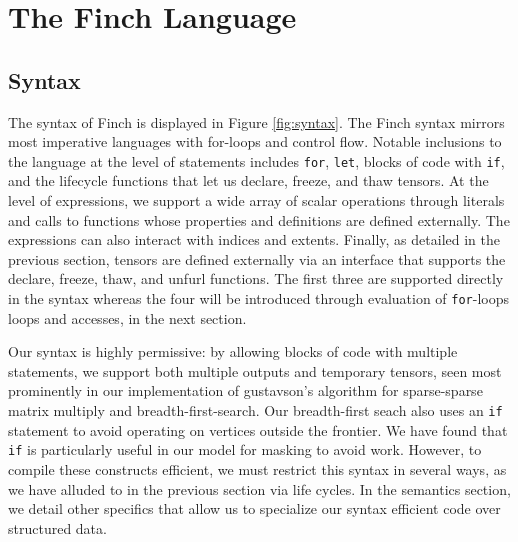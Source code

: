 
\section{The Finch Language}

\subsection{Syntax}

The syntax of Finch is displayed in Figure \ref{fig:syntax}. The Finch syntax
mirrors most imperative languages with for-loops and control flow. Notable
inclusions to the language at the level of statements includes \texttt{for},
\texttt{let}, blocks of code with \texttt{if}, and 
the lifecycle functions that let us declare, freeze, and thaw tensors.
%
At the level of expressions, we support a wide array of scalar operations through literals and calls to functions whose properties and definitions are defined externally.
%
The expressions can also interact with indices and extents.
Finally, as detailed in the previous section, tensors are defined externally via an interface that supports the declare, freeze, thaw, and unfurl functions.
%
The first three are supported directly in the syntax whereas the four will be introduced through evaluation of \texttt{for}-loops loops and accesses,
in the next section.
%

Our syntax is highly permissive: by allowing blocks of code with multiple statements, we support both multiple outputs and temporary tensors, seen most prominently in our implementation of gustavson's algorithm for sparse-sparse matrix multiply and breadth-first-search.
%
Our breadth-first seach also uses an
\texttt{if} statement to avoid operating on vertices outside the
frontier. 
%
We have found that \texttt{if} is particularly useful in
our model for masking to avoid work.
%
However, to compile these constructs efficient, we must restrict this syntax in several ways, as we have alluded to in the previous section via life cycles.
%
In the semantics section, we detail other specifics that allow us to specialize our syntax efficient code over structured data.



